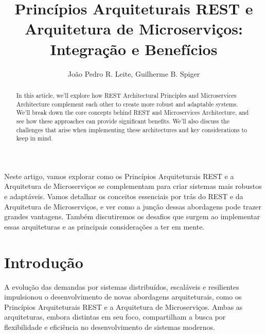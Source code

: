 \documentclass[12pt]{article}
\title{Princípios Arquiteturais REST e Arquitetura de Microserviços: Integração e Benefícios}
\author{João Pedro R. Leite\inst{1}, Guilherme B. Spiger\inst{2}}
\begin{document}
 
	
	\maketitle
	
	\begin{abstract}
		In this article, we’ll explore how REST Architectural Principles and Microservices Architecture complement each other to create more robust and adaptable systems. We’ll break down the core concepts behind REST and Microservices Architecture, and see how these approaches can provide significant benefits. We’ll also discuss the challenges that arise when implementing these architectures and key considerations to keep in mind.
	\end{abstract}
	
	\begin{resumo}
		Neste artigo, vamos explorar como os Princípios Arquiteturais REST e a Arquitetura de Microserviços se complementam para criar sistemas mais robustos e adaptáveis. Vamos detalhar os conceitos essenciais por trás do REST e da Arquitetura de Microserviços, e ver como a junção dessas abordagens pode trazer grandes vantagens. Também discutiremos os desafios que surgem ao implementar essas arquiteturas e as principais considerações a ter em mente.
	\end{resumo}
	
	\section{Introdução}
	
	A evolução das demandas por sistemas distribuídos, escaláveis e resilientes impulsionou o desenvolvimento de novas abordagens arquiteturais, como os Princípios Arquiteturais REST e a Arquitetura de Microserviços. Ambas as arquiteturas, embora distintas em seu foco, compartilham a busca por flexibilidade e eficiência no desenvolvimento de sistemas modernos.
	
\end{document}
